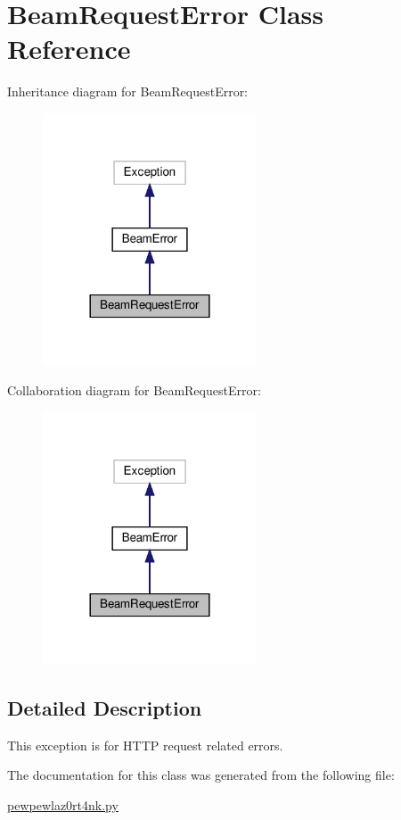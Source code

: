 \hypertarget{classpewpewlaz0rt4nk_1_1_beam_request_error}{}\section{Beam\+Request\+Error Class Reference}
\label{classpewpewlaz0rt4nk_1_1_beam_request_error}


Inheritance diagram for Beam\+Request\+Error\+:
\nopagebreak
\begin{figure}[H]
\begin{center}
\leavevmode
\includegraphics[width=180pt]{classpewpewlaz0rt4nk_1_1_beam_request_error__inherit__graph}
\end{center}
\end{figure}


Collaboration diagram for Beam\+Request\+Error\+:
\nopagebreak
\begin{figure}[H]
\begin{center}
\leavevmode
\includegraphics[width=180pt]{classpewpewlaz0rt4nk_1_1_beam_request_error__coll__graph}
\end{center}
\end{figure}


\subsection{Detailed Description}
\begin{DoxyVerb}This exception is for HTTP request related errors.\end{DoxyVerb}
 

The documentation for this class was generated from the following file\+:\begin{DoxyCompactItemize}
\item 
\hyperlink{pewpewlaz0rt4nk_8py}{pewpewlaz0rt4nk.\+py}\end{DoxyCompactItemize}
